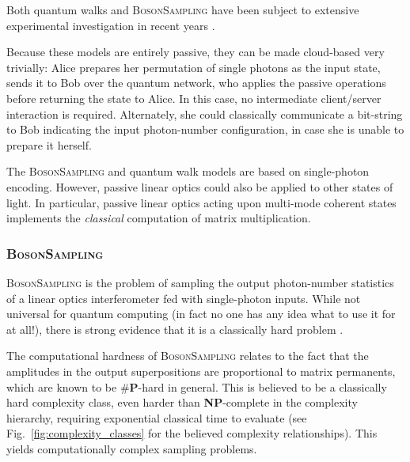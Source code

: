 Both quantum walks and \textsc{BosonSampling} have been subject to extensive experimental investigation in recent years \cite{bib:PeruzzoQW, bib:Broome10, bib:Schreiber11b, bib:Owens11, bib:RohdeQWExp12, bib:Broome2012, bib:RohdeQWExp12, bib:Spring2, bib:Crespi3, bib:Tillmann4}.

Because these models are entirely passive, they can be made cloud-based very trivially: Alice prepares her permutation of single photons as the input state, sends it to Bob over the quantum network, who applies the passive operations before returning the state to Alice. In this case, no intermediate client/server interaction is required. Alternately, she could classically communicate a bit-string to Bob indicating the input photon-number configuration, in case she is unable to prepare it herself.

The \textsc{BosonSampling} and quantum walk models are based on single-photon encoding. However, passive linear optics could also be applied to other states of light. In particular, passive linear optics acting upon multi-mode coherent states implements the \textit{classical} computation of matrix multiplication.

%
%

\subsubsection{\textsc{BosonSampling}} \label{sec:boson_sampling} 

\textsc{BosonSampling} is the problem of sampling the output photon-number statistics of a linear optics interferometer fed with single-photon inputs. While not universal for quantum computing (in fact no one has any idea what to use it for at all!), there is strong evidence that it is a classically hard problem \cite{bib:AaronsonArkhipov10, bib:RohdeIntroBS15}.

The computational hardness of \textsc{BosonSampling} relates to the fact that the amplitudes in the output superpositions are proportional to matrix permanents, which are known to be \#\textbf{P}-hard in general. This is believed to be a classically hard complexity class, even harder than \textbf{NP}-complete in the complexity hierarchy, requiring exponential classical time to evaluate (see Fig.~\ref{fig:complexity_classes} for the believed complexity relationships). This yields computationally complex sampling problems.

%
%

